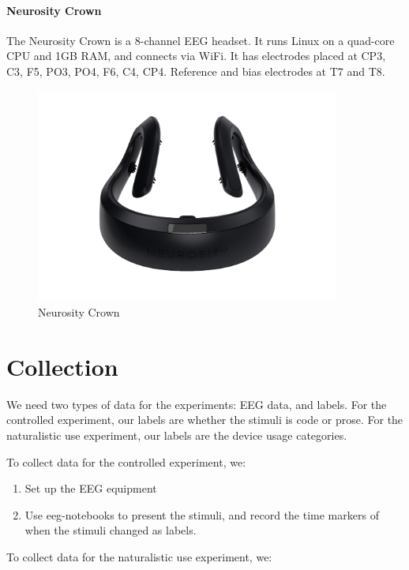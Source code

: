     \begin{minipage}{\textwidth}
        \paragraph*{Neurosity Crown}
        The Neurosity Crown is a 8-channel EEG headset. It runs Linux on a quad-core CPU and 1GB RAM, and connects via WiFi. It has electrodes placed at CP3, C3, F5, PO3, PO4, F6, C4, CP4. Reference and bias electrodes at T7 and T8.

        \begin{figure}[H]
            \centering
            \includegraphics[trim=0 100 0 100,clip,width=100mm]{img/crown-1.png}
            \caption{Neurosity Crown}\label{fig:crown}
        \end{figure}
    \end{minipage}

\pagebreak
\section{Collection}

We need two types of data for the experiments: EEG data, and labels. For the controlled experiment, our labels are whether the stimuli is code or prose. For the naturalistic use experiment, our labels are the device usage categories.

To collect data for the controlled experiment, we:

\begin{enumerate}
    \item Set up the EEG equipment
    \item Use eeg-notebooks to present the stimuli, and record the time markers of when the stimuli changed as labels.
\end{enumerate}

To collect data for the naturalistic use experiment, we:

